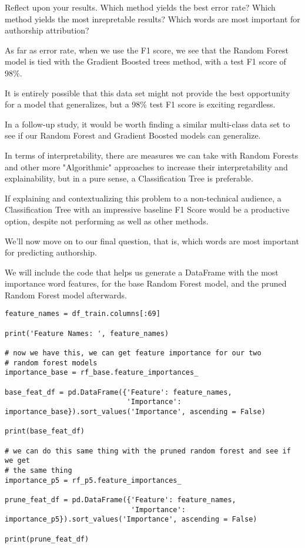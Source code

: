 \documentclass[12pt, letterpaper]{article}
\begin{document}
Reflect upon your results. Which method yields the best error rate? Which method yields the most inrepretable results? Which words are most important for authorship attribution? 

As far as error rate, when we use the F1 score, we see that the Random Forest model is tied with the Gradient Boosted trees method, with a test F1 score of 98\%. 

It is entirely possible that this data set might not provide the best opportunity for a model that generalizes, but a 98\% test F1 score is exciting regardless. 

In a follow-up study, it would be worth finding a similar multi-class data set to see if our Random Forest and Gradient Boosted models can generalize. 

In terms of interpretability, there are measures we can take with Random Forests and other more "Algorithmic" approaches to increase their interpretability and explainability, but in a pure sense, a Classification Tree is preferable. 

If explaining and contextualizing this problem to a non-technical audience, a Classification Tree with an impressive baseline F1 Score would be a productive option, despite not performing as well as other methods. 

We'll now move on to our final question, that is, which words are most important for predicting authorship. 

We will include the code that helps us generate a DataFrame with the most importance word features, for the base Random Forest model, and the pruned Random Forest model afterwards. 

\begin{verbatim}
feature_names = df_train.columns[:69]

print('Feature Names: ', feature_names)

# now we have this, we can get feature importance for our two 
# random forest models 
importance_base = rf_base.feature_importances_

base_feat_df = pd.DataFrame({'Feature': feature_names, 
                             'Importance': importance_base}).sort_values('Importance', ascending = False)

print(base_feat_df)

# we can do this same thing with the pruned random forest and see if we get 
# the same thing 
importance_p5 = rf_p5.feature_importances_ 

prune_feat_df = pd.DataFrame({'Feature': feature_names, 
                              'Importance': importance_p5}).sort_values('Importance', ascending = False)

print(prune_feat_df) 
\end{verbatim}
\end{document}

